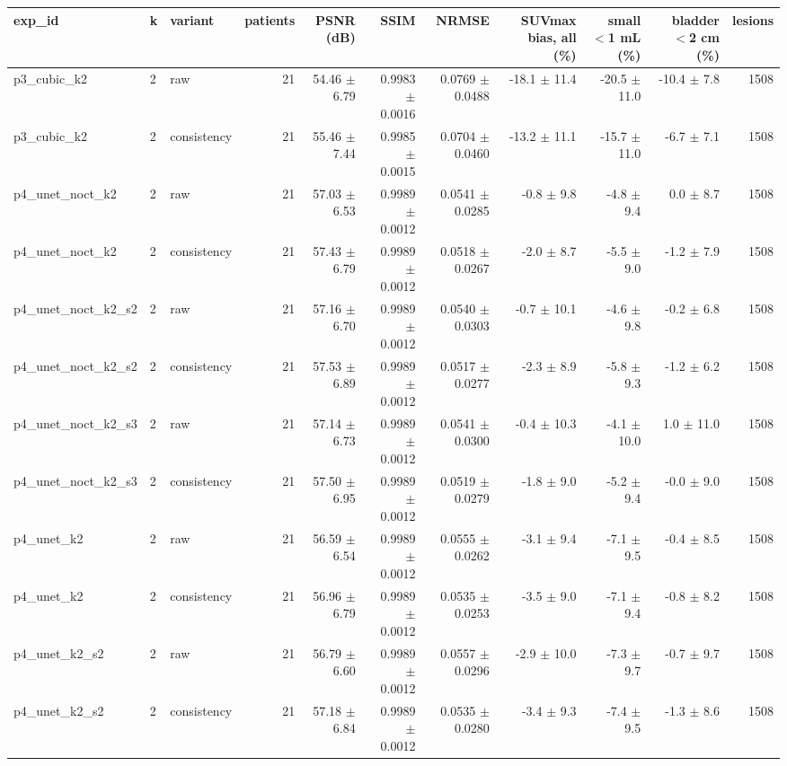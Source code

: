 \begin{tabular}{lllrrrrrrrr}
\toprule
exp\_id & k & variant & patients & PSNR (dB) & SSIM & NRMSE & SUVmax bias, all (\%) & small $<$1 mL (\%) & bladder $<$2 cm (\%) & lesions \\
\midrule
p3\_cubic\_k2 & 2 & raw & 21 & 54.46 $\pm$ 6.79 & 0.9983 $\pm$ 0.0016 & 0.0769 $\pm$ 0.0488 & -18.1 $\pm$ 11.4 & -20.5 $\pm$ 11.0 & -10.4 $\pm$ 7.8 & 1508 \\
p3\_cubic\_k2 & 2 & consistency & 21 & 55.46 $\pm$ 7.44 & 0.9985 $\pm$ 0.0015 & 0.0704 $\pm$ 0.0460 & -13.2 $\pm$ 11.1 & -15.7 $\pm$ 11.0 & -6.7 $\pm$ 7.1 & 1508 \\
p4\_unet\_noct\_k2 & 2 & raw & 21 & 57.03 $\pm$ 6.53 & 0.9989 $\pm$ 0.0012 & 0.0541 $\pm$ 0.0285 & -0.8 $\pm$ 9.8 & -4.8 $\pm$ 9.4 & 0.0 $\pm$ 8.7 & 1508 \\
p4\_unet\_noct\_k2 & 2 & consistency & 21 & 57.43 $\pm$ 6.79 & 0.9989 $\pm$ 0.0012 & 0.0518 $\pm$ 0.0267 & -2.0 $\pm$ 8.7 & -5.5 $\pm$ 9.0 & -1.2 $\pm$ 7.9 & 1508 \\
p4\_unet\_noct\_k2\_s2 & 2 & raw & 21 & 57.16 $\pm$ 6.70 & 0.9989 $\pm$ 0.0012 & 0.0540 $\pm$ 0.0303 & -0.7 $\pm$ 10.1 & -4.6 $\pm$ 9.8 & -0.2 $\pm$ 6.8 & 1508 \\
p4\_unet\_noct\_k2\_s2 & 2 & consistency & 21 & 57.53 $\pm$ 6.89 & 0.9989 $\pm$ 0.0012 & 0.0517 $\pm$ 0.0277 & -2.3 $\pm$ 8.9 & -5.8 $\pm$ 9.3 & -1.2 $\pm$ 6.2 & 1508 \\
p4\_unet\_noct\_k2\_s3 & 2 & raw & 21 & 57.14 $\pm$ 6.73 & 0.9989 $\pm$ 0.0012 & 0.0541 $\pm$ 0.0300 & -0.4 $\pm$ 10.3 & -4.1 $\pm$ 10.0 & 1.0 $\pm$ 11.0 & 1508 \\
p4\_unet\_noct\_k2\_s3 & 2 & consistency & 21 & 57.50 $\pm$ 6.95 & 0.9989 $\pm$ 0.0012 & 0.0519 $\pm$ 0.0279 & -1.8 $\pm$ 9.0 & -5.2 $\pm$ 9.4 & -0.0 $\pm$ 9.0 & 1508 \\
p4\_unet\_k2 & 2 & raw & 21 & 56.59 $\pm$ 6.54 & 0.9989 $\pm$ 0.0012 & 0.0555 $\pm$ 0.0262 & -3.1 $\pm$ 9.4 & -7.1 $\pm$ 9.5 & -0.4 $\pm$ 8.5 & 1508 \\
p4\_unet\_k2 & 2 & consistency & 21 & 56.96 $\pm$ 6.79 & 0.9989 $\pm$ 0.0012 & 0.0535 $\pm$ 0.0253 & -3.5 $\pm$ 9.0 & -7.1 $\pm$ 9.4 & -0.8 $\pm$ 8.2 & 1508 \\
p4\_unet\_k2\_s2 & 2 & raw & 21 & 56.79 $\pm$ 6.60 & 0.9989 $\pm$ 0.0012 & 0.0557 $\pm$ 0.0296 & -2.9 $\pm$ 10.0 & -7.3 $\pm$ 9.7 & -0.7 $\pm$ 9.7 & 1508 \\
p4\_unet\_k2\_s2 & 2 & consistency & 21 & 57.18 $\pm$ 6.84 & 0.9989 $\pm$ 0.0012 & 0.0535 $\pm$ 0.0280 & -3.4 $\pm$ 9.3 & -7.4 $\pm$ 9.5 & -1.3 $\pm$ 8.6 & 1508 \\

\end{tabular}
